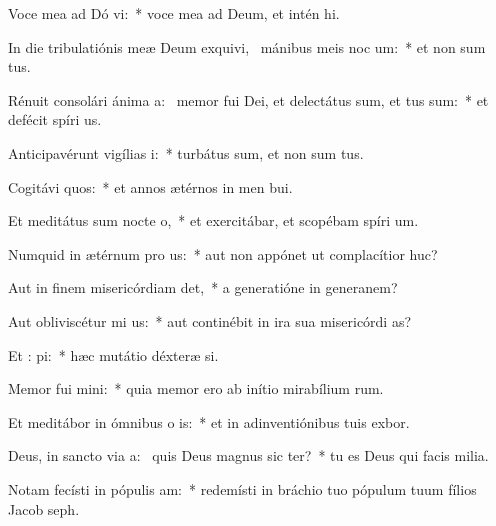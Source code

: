 \item Voce mea ad Dó vi:~* voce mea ad Deum, et intén hi.
\item In die tribulatiónis meæ Deum exquivi,~\pscross{} mánibus meis noc  um:~* et non sum tus.
\item Rénuit consolári ánima a:~\pscross{} memor fui Dei, et delectátus sum, et tus sum:~* et defécit spíri us.
\item Anticipavérunt vigílias  i:~* turbátus sum, et non sum tus.
\item Cogitávi  quos:~* et annos ætérnos in men bui.
\item Et meditátus sum nocte   o,~* et exercitábar, et scopébam spíri um.
\item Numquid in ætérnum pro us:~* aut non appónet ut complacítior  huc?
\item Aut in finem misericórdiam  det,~* a generatióne in generanem?
\item Aut obliviscétur mi us:~* aut continébit in ira sua misericórdi as?
\item Et :  pi:~* hæc mutátio déxteræ si.
\item Memor fui  mini:~* quia memor ero ab inítio mirabílium rum.
\item Et meditábor in ómnibus o is:~* et in adinventiónibus tuis exbor.
\item Deus, in sancto via a:~\pscross{} quis Deus magnus sic  ter?~* tu es Deus qui facis milia.
\item Notam fecísti in pópulis  am:~* redemísti in bráchio tuo pópulum tuum fílios Jacob  seph.
